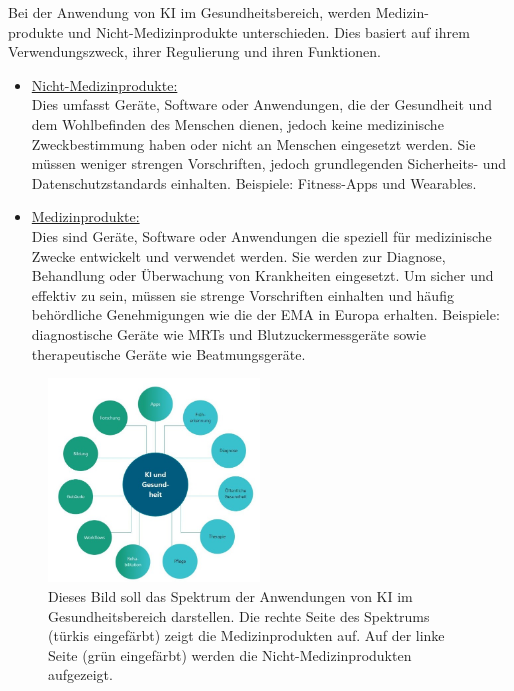 \documentclass{report}
\begin{document}

Bei der Anwendung von KI im Gesundheitsbereich, werden Medizin-\\produkte und Nicht-Medizinprodukte 
unterschieden. Dies basiert auf ihrem Verwendungszweck, ihrer Regulierung und ihren Funktionen.

\begin{itemize}
\item \underline{Nicht-Medizinprodukte:}\\ Dies umfasst Geräte, Software oder Anwendungen, die 
der Gesundheit und dem Wohlbefinden des Menschen dienen, jedoch keine medizinische Zweckbestimmung haben oder nicht an Menschen 
eingesetzt werden. Sie müssen weniger strengen Vorschriften, jedoch grundlegenden Sicherheits- und Datenschutzstandards
einhalten. Beispiele: Fitness-Apps und Wearables.
\item \underline{Medizinprodukte:} \\Dies sind Geräte, Software oder Anwendungen die speziell für medizinische Zwecke 
entwickelt und verwendet werden. Sie werden zur Diagnose, Behandlung oder Überwachung von Krankheiten eingesetzt.
Um sicher und effektiv zu sein, müssen sie strenge Vorschriften einhalten und häufig behördliche Genehmigungen wie die der EMA 
in Europa erhalten. Beispiele: diagnostische Geräte wie MRTs und Blutzuckermessgeräte sowie therapeutische Geräte
wie Beatmungsgeräte.
\end{itemize}

\begin{figure}[H]
    \centering
    \includegraphics[width=0.50\textwidth]{Bild13.jpg}
    \caption{Dieses Bild soll das Spektrum der Anwendungen von KI im Gesundheitsbereich darstellen. Die rechte Seite des Spektrums (türkis eingefärbt)
    zeigt die Medizinprodukten auf. Auf der linke Seite (grün eingefärbt) werden die Nicht-Medizinprodukten aufgezeigt.}
    \label{fig:Bildmedizin}
\end{figure}
\end{document}
